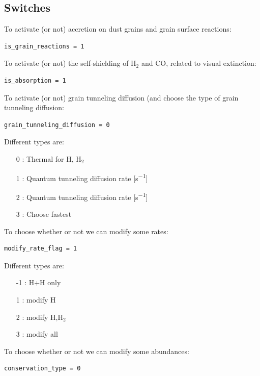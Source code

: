\documentclass[english,a4paper,twoside]{article}
\newcommand{\molecule}[1]{\ensuremath{\mathrm{#1}}}
\begin{document}
\subsection{Switches}
To activate (or not) accretion on dust grains and grain surface reactions:
\begin{verbatim}
is_grain_reactions = 1
\end{verbatim}

To activate (or not) the self-shielding of $\molecule{H_2}$ and $\molecule{CO}$, related to visual extinction: 
\begin{verbatim}
is_absorption = 1
\end{verbatim}

To activate (or not) grain tunneling diffusion (and choose the type of grain tunneling diffusion: 
\begin{verbatim}
grain_tunneling_diffusion = 0
\end{verbatim}

Different types are:
\begin{itemize}
\item[0] : Thermal for H, \molecule{H_2}
\item[1] : Quantum tunneling diffusion rate [\unit{s^{-1}}] \citep{1976RvMP...48..513W}
\item[2] : Quantum tunneling diffusion rate [\unit{s^{-1}}] \citep{1992ApJS...82..167H}
\item[3] : Choose fastest
\end{itemize}

To choose whether or not we can modify some rates:
\begin{verbatim}
modify_rate_flag = 1
\end{verbatim}

Different types are:
\begin{itemize}
\item[-1] : H+H only
\item[1] : modify H
\item[2] : modify H,\molecule{H_2}
\item[3] : modify all
\end{itemize}

To choose whether or not we can modify some abundances:
\begin{verbatim}
conservation_type = 0
\end{verbatim}
\end{document}
